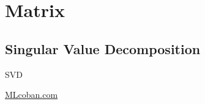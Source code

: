 \chapter{Matrix}

\section{Singular Value Decomposition}

\ac{SVD}

\href{https://machinelearningcoban.com/2017/06/07/svd/}{MLcoban.com}